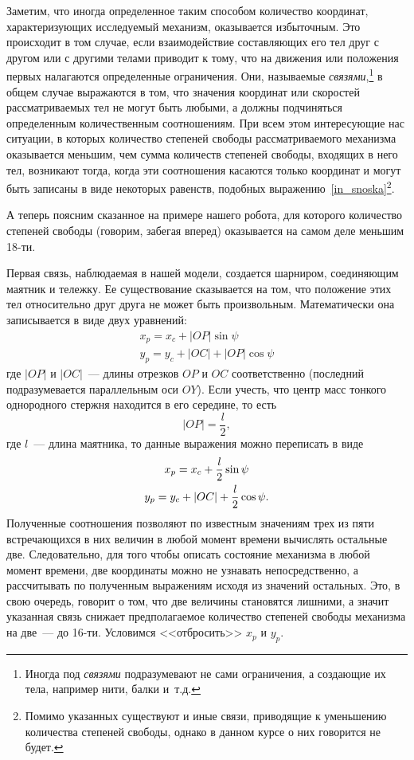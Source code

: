 \documentclass[12pt,a4paper,openany]{extarticle}
\begin{document}
Заметим, что иногда определенное таким способом количество координат, характеризующих исследуемый механизм, оказывается избыточным.
Это происходит в том случае, если взаимодействие составляющих его тел друг с другом или с другими телами приводит к тому, что на движения или положения первых налагаются определенные ограничения.
Они, называемые \textit{связями}\lefteqn,\footnote{Иногда под \textit{связями} подразумевают не сами ограничения, а создающие их тела, например нити, балки и~т.д.} в общем случае выражаются в том, что значения координат или скоростей рассматриваемых тел не могут быть любыми, а должны подчиняться определенным количественным соотношениям.
При всем этом интересующие нас ситуации, в которых количество степеней свободы рассматриваемого механизма оказывается меньшим, чем сумма количеств степеней свободы, входящих в него тел, возникают тогда, когда эти соотношения касаются только координат и могут быть записаны в виде некоторых равенств, подобных выражению~\eqref{in_snoska}\footnote{Помимо указанных существуют и иные связи, приводящие к уменьшению количества степеней свободы, однако в данном курсе о них говорится не будет.}\!\!.

А теперь поясним сказанное на примере нашего робота, для которого количество степеней свободы (говорим, забегая вперед) оказывается на самом деле меньшим 18-ти.

Первая связь, наблюдаемая в нашей модели, создается шарниром, соединяющим маятник и тележку.
Ее существование сказывается на том, что положение этих тел относительно друг друга не может быть произвольным.
Математически она записывается в виде двух уравнений:
\begin{gather}
	x_p = x_c + |OP|\sin\psi\\
	y_p = y_c + |OC| + |OP|\cos\psi
\end{gather}   
где $|OP|$ и $|OC|$~--- длины отрезков $OP$ и $OC$ соответственно (последний подразумевается параллельным оси $OY$).
Если учесть, что центр масс тонкого однородного стержня находится в его середине, то есть
\begin{equation}
	|OP| = \frac{l}{2},
\end{equation} 
где $l$~--- длина маятника, то данные выражения можно переписать в виде
\begin{gather}
	x_p = x_c + \frac{l}{2}\sin\psi \label{xp}\\
	y_p = y_c + |OC| + \frac{l}{2}\cos\psi\ldotp \label{yp} 
\end{gather}   
Полученные соотношения позволяют по известным значениям трех из пяти встречающихся в них величин в любой момент времени вычислять остальные две.
Следовательно, для того чтобы описать состояние механизма в любой момент времени, две координаты можно не узнавать непосредственно, а рассчитывать по полученным выражениям исходя из значений остальных.
Это, в свою очередь, говорит о том, что две величины становятся лишними, а значит указанная связь снижает предполагаемое количество степеней свободы механизма на две~--- до 16-ти.  
Условимся <<отбросить>> $x_p$ и $y_p$.
\end{document}
